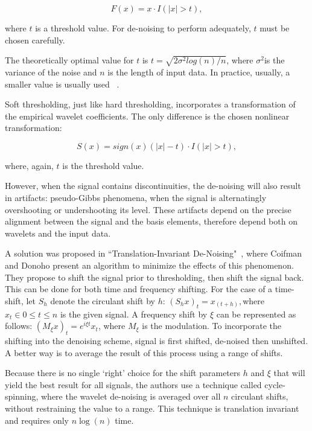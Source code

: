 \begin{equation}
    F(x)=x\cdot I(|x|>t),
    \label{eq:wavelet_1}
\end{equation}

where $t$ is a threshold value. For de-noising to perform adequately, $t$ must be chosen carefully.

The theoretically optimal value for $t$ is $t=\sqrt{2\sigma^{2}log(n)/n}$, where $\sigma^{2}$is the variance of the noise and $n$ is the length of input data. In practice, usually, a smaller value is usually used ~\cite{thresholding}.

Soft thresholding, just like hard thresholding, incorporates a transformation of the empirical wavelet coefficients. The only difference is the chosen nonlinear transformation:

\begin{equation}
    S(x)=sign(x)(|x|-t)\cdot I(|x|>t),
    \label{eq:wavelet_2}
\end{equation}

where, again, $t$ is the threshold value.

However, when the signal contains discontinuities, the de-noising will also result in artifacts: pseudo-Gibbs phenomena, when the signal is alternatingly overshooting or undershooting its level. These artifacts depend on the precise alignment between the signal and the basis elements, therefore depend both on wavelets and the input data. 

A solution was proposed in ``Translation-Invariant De-Noising"~\cite{wavelet}, where Coifman and Donoho present an algorithm to minimize the effects of this phenomenon. They propose to shift the signal prior to thresholding, then shift the signal back. This can be done for both time and frequency shifting. For the case of a time-shift, let $S_{h}$ denote the circulant shift by $h$: $(S_{h}x)_{t}=x_{(t+h)}, $where $x_{t}\in0\leq t\leq n$ is the given signal. A frequency shift by $\xi$ can be represented as follows: $(M_{\xi}x)_{t}=e^{i\xi t}x_{t}$, where $M_{\xi}$ is the modulation. To incorporate the shifting into the denoising scheme, signal is first shifted, de-noised then unshifted. A better way is to average the result of this process using a range of shifts.
 
Because there is no single `right' choice for the shift parameters $h$ and $\xi$ that will yield the best result for all signals, the authors use a technique called cycle-spinning, where the wavelet de-noising is averaged over all $n$ circulant shifts, without restraining the value to a range. This technique is translation invariant and requires only $n\log(n)$ time.

